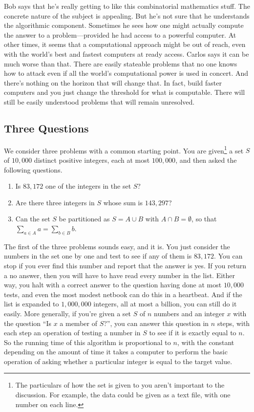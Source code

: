 \begin{discussion}
Bob says that he's really getting to like this combinatorial
mathematics stuff. The concrete nature of the subject is appealing.
But he's not sure that he understands the algorithmic component.
Sometimes he sees how one might actually compute the answer to a
problem---provided he had access to a powerful computer.  At other
times, it seems that a computational approach might be out of
reach, even with the world's best and fastest computers at ready
access.  Carlos says it can be much worse than that.  There are
easily stateable problems that no one knows how to attack even
if all the world's computational power is used in concert.  And there's nothing on the
horizon that will change that.  In fact, build faster computers and
you just change the threshold for what is computable.  There will still
be easily understood problems that will remain unresolved.
\end{discussion}

\subsection{Three Questions}

We consider three problems with a common starting point.  You are
given\footnote{The particulars of how the set is given to you
aren't important to the discussion.  For example, the data could be given
as a text file, with one number on each line.} a set $S$ of 
$10,000$ distinct positive integers, each at most
$100,000$,  and then asked the following questions.

\begin{enumerate}
\item Is $83,172$ one of the integers in the set $S$?
\item Are there three integers in $S$ whose sum is $143,297$?
\item Can the set $S$ be partitioned as $S=A\cup B$ with
$A\cap B=\emptyset$, so that $\sum_{a\in A}a=\sum_{b\in B}b$.
\end{enumerate}

The first of the three problems sounds easy, and it is.  You just consider
the numbers in the set one by one and test to see if any of them is
$83,172$.  You can stop if you ever find this number and
report that the answer is yes.  If you return a no answer, then you
will have to have read every number in the list.  Either way, you halt
with a correct answer to the question having done at most $10,000$
tests, and even the most modest netbook can do this in a heartbeat.
And if the list is expanded to $1,000,000$ integers, all at most
a billion, you can still do it easily.  More generally, if you're
given a set $S$ of $n$ numbers and an integer $x$ with the question
``Is $x$ a member of $S$?'', you can answer this question in
$n$ steps, with each step an operation of testing a number in $S$
to see if it is exactly equal to $n$.  So the running time of this
algorithm is proportional to $n$, with the constant depending on
the amount of time it takes a computer to perform the basic operation
of asking whether a particular integer is equal to the target value.

